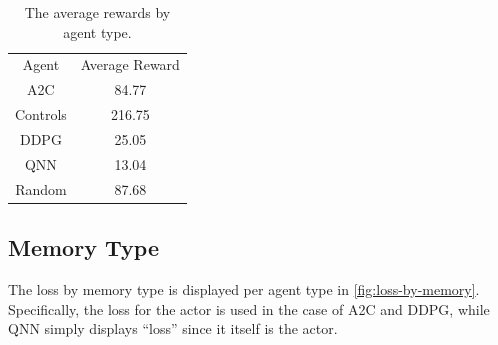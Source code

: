 \begin{table}[!htbp]
    \renewcommand{\arraystretch}{1.3}

    \caption{The average rewards by agent type.}
    \label{tab:agent-average-reward}

    \centering
    \begin{tabular}{|c|c|}
        \hline
        Agent    & Average Reward \\
        \hhline{|=|=|}
        A2C      & 84.77          \\
        \hline
        Controls & 216.75         \\
        \hline
        DDPG     & 25.05          \\
        \hline
        QNN      & 13.04          \\
        \hline
        Random   & 87.68          \\
        \hline
    \end{tabular}
\end{table}

\subsection{Memory Type}\label{subsec:memory-type}
The loss by memory type is displayed per agent type in \autoref{fig:loss-by-memory}.
Specifically, the loss for the actor is used in the case of A2C and DDPG, while QNN
simply displays ``loss'' since it itself is the actor.

